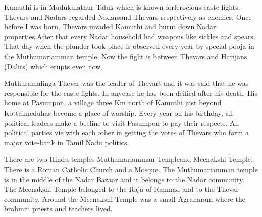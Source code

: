 Kamuthi is in Mudukulathur Taluk which is known for\break ferocious caste 
fights. Thevars and Nadars regarded Nadars\break and Thevars respectively as 
enemies. Once before I was born, Thevars invaded Kamuthi and burnt down 
Nadar properties.\break After that every Nadar household had weapons like 
sickles and spears. That day when the plunder took place is observed 
every year by special pooja in the Muthumariamman temple. Now the fight 
is between Thevars and Harijans (Dalits) which erupts even now.

Muthuramalinga Thevar was the leader of Thevars and it was said that he 
was responsible for the caste fights. In any\break case he has been deified 
after his death. His home at Pasumpon, a village three Km north of 
Kamuthi just beyond Kottaimedu\break has become a place of worship. Every year 
on his birthday, all political leaders make a beeline to visit Pasumpon 
to pay their respects. All political parties vie with each other in 
getting the votes of Thevars who form a major vote-bank in Tamil Nadu 
politi\-cs.
 
There are two Hindu temples Muthumariamman Temple\break and Meenakshi Temple. 
There is a Roman Catholic Church and a Mosque. The Muthumariamman temple 
is in the middle of the Nadar Bazaar and it belongs to the Nadar 
community. The Meenakshi Temple belonged to the Raja of Ramnad and to 
the Thevar community. Around the Meenakshi Temple was a small Agraharam 
where the brahmin priests and teachers lived.
\smallskip

